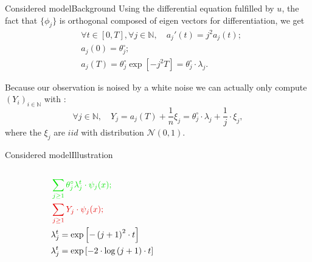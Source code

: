 \documentclass[10pt]{beamer}
\begin{document}
\begin{frame}{Considered model}{Background}
Using the differential equation fulfilled by $u$, the fact that $\{\phi_{j}\}$ is orthogonal composed of eigen vectors for differentiation, we get
\begin{alignat*}{1}
& \forall t \in [0, T],\forall j \in \mathbb{N}, \quad  a_{j}'(t) = j^{2} a_{j}(t) ;\\
& a_{j}(0) = \theta^{\circ}_{j} ;\\
& a_{j}(T) = \theta^{\circ}_{j} \exp\left[-j^{2} T \right] = \theta^{\circ}_{j} \cdot \lambda_{j}.
\end{alignat*}

Because our observation is noised by a white noise we can actually only compute $(Y_{i})_{i \in \mathbb{N}}$ with :
\[\forall j \in \mathbb{N}, \quad Y_{j} = a_{j}(T) + \frac{1}{n} \xi_{j} = \theta^{\circ}_{j} \cdot \lambda_{j} + \frac{1}{j} \cdot \xi_{j},\]
where the $\xi_{j}$ are $iid$ with distribution $\mathcal{N}(0,1).$

\end{frame}

\begin{frame}{Considered model}{Illustration}
\begin{columns}[c]
	\begin{column}{3cm}
		\begin{alignat*}{2}
&\color{green!90!black} \sum\limits_{j \geq 1}\theta^{\circ}_{j} \lambda_{j}^{t} \cdot \psi_{j}(x);&&\\
&\color{red!90!black} \sum\limits_{j \geq 1} Y_{j} \cdot \psi_{j}(x);&&\\
&\lambda_{j}^{t} = \exp\left[-\left(j + 1\right)^{2} \cdot t \right]&&\\
&\lambda_{j}^{t} = \exp\left[-2 \cdot \log\left(j + 1\right) \cdot t \right]&&
		\end{alignat*}
	\end{column}
	\begin{column}{8cm}
		\begin{center}
		\end{center}
	\end{column}
\end{columns}
\end{frame}

%
%
%
\end{document}
